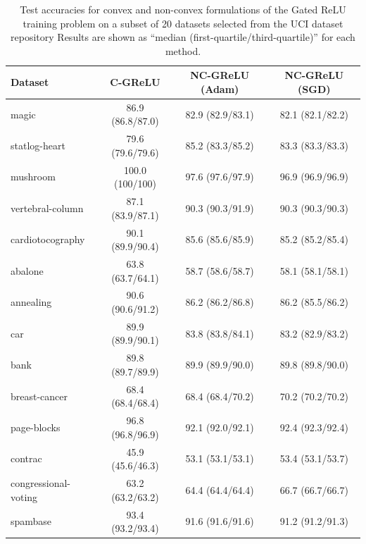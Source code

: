 \begin{table}
	\centering
	\caption{Test accuracies for convex and non-convex formulations of the Gated ReLU training problem on a subset of 20 datasets selected from the UCI dataset repository
		Results are shown as ``median (first-quartile/third-quartile)'' for each method.}%
	\label{table:uci-gated-accuracies}
	\vspace{0.1in}
	\begin{small}
		\begin{tabular}{lccc} \toprule
			\textbf{Dataset}     & \textbf{C-GReLU} & \textbf{NC-GReLU (Adam)} & \textbf{NC-GReLU (SGD)} \\ \midrule
			magic                & 86.9 (86.8/87.0) & 82.9 (82.9/83.1)         & 82.1 (82.1/82.2)        \\
			statlog-heart        & 79.6 (79.6/79.6) & 85.2 (83.3/85.2)         & 83.3 (83.3/83.3)        \\
			mushroom             & 100.0 (100/100)  & 97.6 (97.6/97.9)         & 96.9 (96.9/96.9)        \\
			vertebral-column     & 87.1 (83.9/87.1) & 90.3 (90.3/91.9)         & 90.3 (90.3/90.3)        \\
			cardiotocography     & 90.1 (89.9/90.4) & 85.6 (85.6/85.9)         & 85.2 (85.2/85.4)        \\
			abalone              & 63.8 (63.7/64.1) & 58.7 (58.6/58.7)         & 58.1 (58.1/58.1)        \\
			annealing            & 90.6 (90.6/91.2) & 86.2 (86.2/86.8)         & 86.2 (85.5/86.2)        \\
			car                  & 89.9 (89.9/90.1) & 83.8 (83.8/84.1)         & 83.2 (82.9/83.2)        \\
			bank                 & 89.8 (89.7/89.9) & 89.9 (89.9/90.0)         & 89.8 (89.8/90.0)        \\
			breast-cancer        & 68.4 (68.4/68.4) & 68.4 (68.4/70.2)         & 70.2 (70.2/70.2)        \\
			page-blocks          & 96.8 (96.8/96.9) & 92.1 (92.0/92.1)         & 92.4 (92.3/92.4)        \\
			contrac              & 45.9 (45.6/46.3) & 53.1 (53.1/53.1)         & 53.4 (53.1/53.7)        \\
			congressional-voting & 63.2 (63.2/63.2) & 64.4 (64.4/64.4)         & 66.7 (66.7/66.7)        \\
			spambase             & 93.4 (93.2/93.4) & 91.6 (91.6/91.6)         & 91.2 (91.2/91.3)        \\

\end{tabular}
\end{small}
\end{table}
